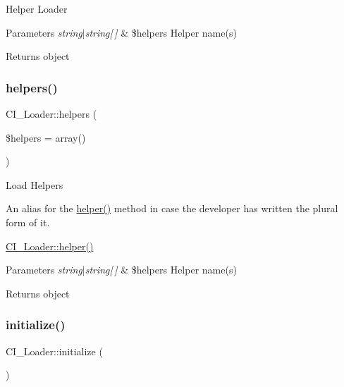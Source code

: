 Helper Loader


\begin{DoxyParams}{Parameters}
{\em string$\vert$string\mbox{[}$\,$\mbox{]}} & \$helpers Helper name(s) \\
\hline
\end{DoxyParams}
\begin{DoxyReturn}{Returns}
object 
\end{DoxyReturn}
\mbox{\label{class_c_i___loader_a995cb4340d1b9c5879ce11eb64ec116e}} 
\subsubsection{\texorpdfstring{helpers()}{helpers()}}
{\footnotesize\ttfamily C\+I\+\_\+\+Loader\+::helpers (\begin{DoxyParamCaption}\item[{}]{\$helpers = {\ttfamily array()} }\end{DoxyParamCaption})}

Load Helpers

An alias for the \mbox{\hyperlink{class_c_i___loader_a8f3936d69b6c7297131594642bb7037d}{helper()}} method in case the developer has written the plural form of it.

\mbox{\hyperlink{class_c_i___loader_a8f3936d69b6c7297131594642bb7037d}{C\+I\+\_\+\+Loader\+::helper()}} 
\begin{DoxyParams}{Parameters}
{\em string$\vert$string\mbox{[}$\,$\mbox{]}} & \$helpers Helper name(s) \\
\hline
\end{DoxyParams}
\begin{DoxyReturn}{Returns}
object 
\end{DoxyReturn}
\mbox{\label{class_c_i___loader_a91836c1d132ac63ef37003d6e02cf4ee}} 
\subsubsection{\texorpdfstring{initialize()}{initialize()}}
{\footnotesize\ttfamily C\+I\+\_\+\+Loader\+::initialize (\begin{DoxyParamCaption}{ }\end{DoxyParamCaption})}

